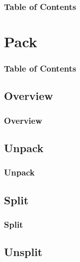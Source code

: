 \documentclass[xcolor=dvipsnames]{beamer}
\begin{document}
	\begin{frame} \frametitle{Table of Contents}
		\tableofcontents[currentsection]
	\end{frame} 


\section{Pack} 

	\begin{frame} \frametitle{Table of Contents}
		\tableofcontents[currentsection]
	\end{frame} 
	
	
	\subsection{Overview}
	
		\begin{frame} \frametitle{Overview}
	
		\end{frame}
		
	\subsection{Unpack}
	
		\begin{frame} \frametitle{Unpack}
	
		\end{frame}
	
	\subsection{Split}
	
		\begin{frame} \frametitle{Split}
	
		\end{frame}
	
	\subsection{Unsplit}
	
\end{document}
